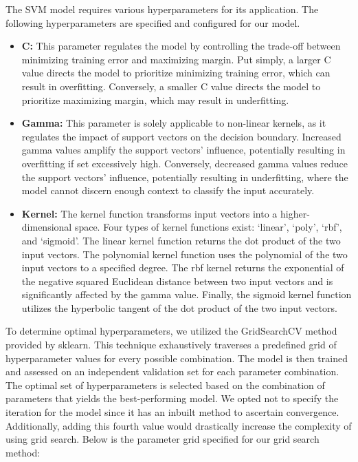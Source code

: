 \documentclass[english,bachelor]{swsLeipzig}
\begin{document}
The SVM model requires various hyperparameters for its application. The following hyperparameters are specified and 
configured for our model.

\begin{itemize}
  \item \textbf{C:} This parameter regulates the model by controlling the trade-off between minimizing training error and maximizing margin. Put simply, a larger C value directs the model to prioritize minimizing training error, which can result in overfitting. Conversely, a smaller C value directs the model to prioritize maximizing margin, which may result in underfitting.
  \item \textbf{Gamma:} This parameter is solely applicable to non-linear kernels, as it regulates the impact of support vectors on the decision boundary. Increased gamma values amplify the support vectors' influence, potentially resulting in overfitting if set excessively high. Conversely, decreased gamma values reduce the support vectors' influence, potentially resulting in underfitting, where the model cannot discern enough context to classify the input accurately.
  \item \textbf{Kernel:} The kernel function transforms input vectors into a higher-dimensional space. Four types of 
  kernel functions exist: `linear', `poly', `rbf', and `sigmoid'. The linear kernel function returns the dot product of the two input vectors. The polynomial kernel function uses the polynomial of the two input vectors to a specified degree. The rbf kernel returns the exponential of the negative squared Euclidean distance between two input vectors and is significantly affected by the gamma value. Finally, the sigmoid kernel function utilizes the hyperbolic tangent of the dot product of the two input vectors.
\end{itemize}

To determine optimal hyperparameters, we utilized the GridSearchCV method provided by sklearn. This technique 
exhaustively traverses a predefined grid of hyperparameter values for every possible combination. The model is then trained and assessed on an independent validation set for each parameter combination. The optimal set of hyperparameters is selected based on the combination of parameters that yields the best-performing model. We opted not to specify the iteration for the model since it has an inbuilt method to ascertain convergence. Additionally, adding this fourth value would drastically increase the complexity of using grid search. Below is the parameter grid specified for our grid search method:\\
\end{document}
